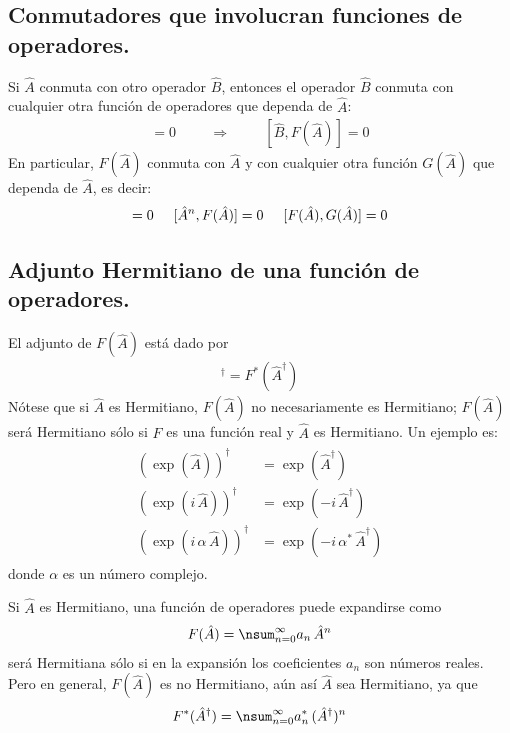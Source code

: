 \subsection*{Conmutadores que involucran funciones de operadores.}
Si $\hat{A}$ conmuta con otro operador $\hat{B}$, entonces el operador $\hat{B}$ conmuta con cualquier otra función de operadores que dependa de $\hat{A}$:
\begin{align}
[\hat{A}, \hat{B}] = 0 \hspace{1cm} \Longrightarrow \hspace{1cm} [\hat{B}, F(\hat{A})] = 0
\label{eq:ecuacion_02_110}
\end{align}
En particular, $F(\hat{A})$ conmuta con $\hat{A}$ y con cualquier otra función $G(\hat{A})$ que dependa de $\hat{A}$, es decir:
\begin{align}
[\hat{A}, F(\hat{A})] = 0 \hspace{0.5cm} [\hat{A}^{n}, F(\hat{A})]= 0 \hspace{0.5cm} [F(\hat{A}), G(\hat{A})] = 0
\label{eq:ecuacion_02_111}
\end{align}

\subsection{Adjunto Hermitiano de una función de operadores.}

El adjunto de $F(\hat{A})$ está dado por
\begin{align}
[F(\hat{A})]^{\dagger} = F^{*}(\hat{A}^{\dagger})
\label{eq:ecuacion_02_112}
\end{align}
Nótese que si $\hat{A}$ es Hermitiano, $F(\hat{A})$ no necesariamente es Hermitiano; $F(\hat{A})$ será Hermitiano sólo si $F$ es una función real y $\hat{A}$ es Hermitiano. Un ejemplo es:
\begin{align}
\begin{aligned}
\left( \exp(\hat{A}) \right)^{\dagger} &= \exp(\hat{A}^{\dagger}) \\[1em]
\left( \exp(i \, \hat{A}) \right)^{\dagger} &= \exp(-i \, \hat{A}^{\dagger}) \\[1em]
\left( \exp(i \, \alpha \, \hat{A}) \right)^{\dagger} &= \exp(-i \, \alpha^{*} \, \hat{A}^{\dagger})
\end{aligned}
\label{eq:ecuacion_02_113}
\end{align}
donde $\alpha$ es un número complejo.
\par
Si $\hat{A}$ es Hermitiano, una función de operadores puede expandirse como
\begin{align*}
F(\hat{A}) = \nsum_{n=0}^{\infty} a_{n} \, \hat{A}^{n}
\end{align*}
será Hermitiana sólo si en la expansión los coeficientes $a_{n}$ son números reales. Pero en general, $F(\hat{A})$ es no Hermitiano, aún así $\hat{A}$ sea Hermitiano, ya que
\begin{align}
F^{*}(\hat{A}^{\dagger}) = \nsum_{n=0}^{\infty} a_{n}^{*} \, (\hat{A}^{\dagger})^{n}
\label{eq:ecuacion_02_114}
\end{align}

